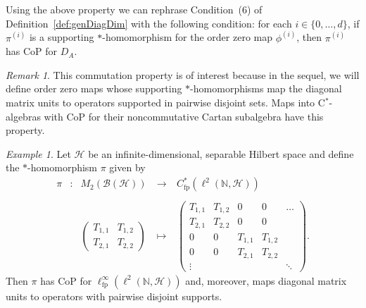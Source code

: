 \documentclass[a4paper]{amsart}
\newcommand{\myhyp}{\textnormal{-}\hskip0pt\relax}
\numberwithin{equation}{section}
\newcommand{\N}{\mathbb{N}}
\newcommand{\Bcal}{\mathcal{B}}
\newcommand{\Hcal}{\mathcal{H}}
\newcommand{\cstar}{C$^\ast$\myhyp{}algebra}
\newcommand{\bop}[1]{\Bcal({#1})}
\newcommand{\Cfp}[1]{C^{\ast}_{\mathrm{fp}}({#1})}
\newcommand{\CfpCartan}[1]{\ell^{\infty}_{\mathrm{fp}}({#1})}
\newcommand{\CoProp}[1]{CoP for ${#1}$}
\theoremstyle{plain}
\theoremstyle{indented}
\numberwithin{equation}{section}
\theoremstyle{definition}
\theoremstyle{remark}
\newtheorem{rmk}[thm]{Remark}
\newtheorem{example}[thm]{Example}
\theoremstyle{plain}
\theoremstyle{definition}
\begin{document}
Using the above property we can rephrase Condition~(6) of Definition~\ref{def:genDiagDim} with the following condition: 
for each ${i\in \{0,\hdots, d\}}$, if
$\pi^{(i)}$ is a supporting ${\ast}$\myhyp{}homomorphism 
for the order zero map $\phi^{(i)}$, 
then $\pi^{(i)}$ has \CoProp{D_A}.

\begin{rmk}
    This commutation property is of interest
    because in the sequel, we will define order zero maps whose supporting $\ast$\myhyp{}homomorphisms 
    map the diagonal matrix units to operators supported in pairwise disjoint sets.
    Maps into \cstar{}s with CoP for their noncommutative Cartan subalgebra have this property.
\end{rmk}

\begin{example}
    Let ${\Hcal}$ be an infinite\myhyp{}dimensional, separable Hilbert space and define
    the $\ast$\myhyp{}homomorphism ${\pi}$ given by
    \[\begin{array}{ccccc}
        {\pi} &\colon & M_2(\bop{\Hcal}) &~\longrightarrow~& \Cfp{\ell^2(\N, \Hcal)}\\
        \\
         & & \begin{pmatrix}
            T_{1,1}  & T_{1,2}  \\
            T_{2,1}  & T_{2,2}
        \end{pmatrix}
        &~\longmapsto~& \begin{pmatrix}
            T_{1,1} & T_{1,2} & 0       & 0  & \hdots \\
            T_{2,1} & T_{2,2} & 0       & 0  \\
            0       & 0       & T_{1,1} & T_{1,2}  \\
            0       & 0       & T_{2,1}  & T_{2,2} \\
            \vdots & &  & & \ddots 
        \end{pmatrix} .
    \end{array}\]
    Then ${\pi}$ has \CoProp{\CfpCartan{\ell^2(\N, \Hcal)}}
    and,
    moreover, maps diagonal matrix units to operators with pairwise disjoint supports.
    

\end{example}
\end{document}
